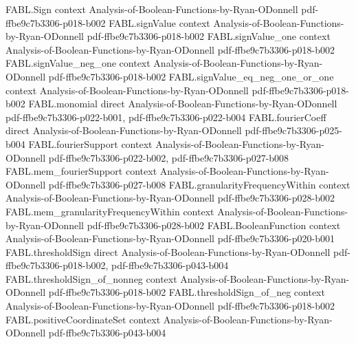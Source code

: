 \begin{theorem}
\label{FABL.linearForm_fourthMoment_le}
\leanok
{}
\proofstep
  {FABL.Sign}
  {context}
  {Analysis-of-Boolean-Functions-by-Ryan-ODonnell}
  {pdf-ffbe9c7b3306-p018-b002}
\proofstep
  {FABL.signValue}
  {context}
  {Analysis-of-Boolean-Functions-by-Ryan-ODonnell}
  {pdf-ffbe9c7b3306-p018-b002}
\proofstep
  {FABL.signValue_one}
  {context}
  {Analysis-of-Boolean-Functions-by-Ryan-ODonnell}
  {pdf-ffbe9c7b3306-p018-b002}
\proofstep
  {FABL.signValue_neg_one}
  {context}
  {Analysis-of-Boolean-Functions-by-Ryan-ODonnell}
  {pdf-ffbe9c7b3306-p018-b002}
\proofstep
  {FABL.signValue_eq_neg_one_or_one}
  {context}
  {Analysis-of-Boolean-Functions-by-Ryan-ODonnell}
  {pdf-ffbe9c7b3306-p018-b002}
\proofstep
  {FABL.monomial}
  {direct}
  {Analysis-of-Boolean-Functions-by-Ryan-ODonnell}
  {pdf-ffbe9c7b3306-p022-b001,
    pdf-ffbe9c7b3306-p022-b004}
\proofstep
  {FABL.fourierCoeff}
  {direct}
  {Analysis-of-Boolean-Functions-by-Ryan-ODonnell}
  {pdf-ffbe9c7b3306-p025-b004}
\proofstep
  {FABL.fourierSupport}
  {context}
  {Analysis-of-Boolean-Functions-by-Ryan-ODonnell}
  {pdf-ffbe9c7b3306-p022-b002,
    pdf-ffbe9c7b3306-p027-b008}
\proofstep
  {FABL.mem_fourierSupport}
  {context}
  {Analysis-of-Boolean-Functions-by-Ryan-ODonnell}
  {pdf-ffbe9c7b3306-p027-b008}
\proofstep
  {FABL.granularityFrequencyWithin}
  {context}
  {Analysis-of-Boolean-Functions-by-Ryan-ODonnell}
  {pdf-ffbe9c7b3306-p028-b002}
\proofstep
  {FABL.mem_granularityFrequencyWithin}
  {context}
  {Analysis-of-Boolean-Functions-by-Ryan-ODonnell}
  {pdf-ffbe9c7b3306-p028-b002}
\proofstep
  {FABL.BooleanFunction}
  {context}
  {Analysis-of-Boolean-Functions-by-Ryan-ODonnell}
  {pdf-ffbe9c7b3306-p020-b001}
\proofstep
  {FABL.thresholdSign}
  {direct}
  {Analysis-of-Boolean-Functions-by-Ryan-ODonnell}
  {pdf-ffbe9c7b3306-p018-b002,
    pdf-ffbe9c7b3306-p043-b004}
\proofstep
  {FABL.thresholdSign_of_nonneg}
  {context}
  {Analysis-of-Boolean-Functions-by-Ryan-ODonnell}
  {pdf-ffbe9c7b3306-p018-b002}
\proofstep
  {FABL.thresholdSign_of_neg}
  {context}
  {Analysis-of-Boolean-Functions-by-Ryan-ODonnell}
  {pdf-ffbe9c7b3306-p018-b002}
\proofstep
  {FABL.positiveCoordinateSet}
  {context}
  {Analysis-of-Boolean-Functions-by-Ryan-ODonnell}
  {pdf-ffbe9c7b3306-p043-b004}

\end{theorem}
